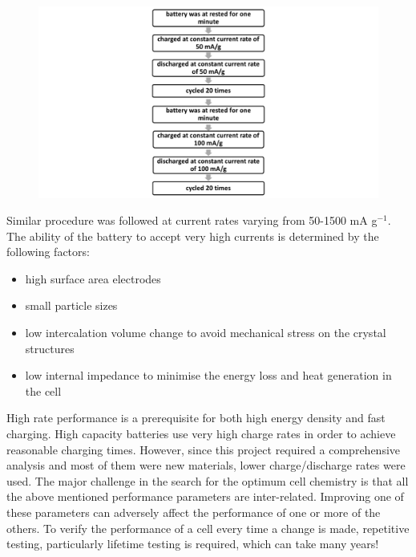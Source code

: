\begin{figure}[tbh!]
\centering
\includegraphics[width=\textwidth]{Figures/chap3fig/flow.pdf}
\caption{}
\label{Figures/chap3fig:flow}
\end{figure}

Similar procedure was followed at current rates varying from 50-1500 mA g$^{-1}$.\\
The ability of the battery to accept very high currents is determined by the following factors:
\begin{itemize}
    \item high surface area electrodes
    \item small particle sizes
    \item low intercalation volume change to avoid mechanical stress on the crystal structures
    \item low internal impedance to minimise the energy loss and heat generation in the cell
\end{itemize}

High rate performance is a prerequisite for both high energy density and fast charging. High capacity batteries use very high charge rates in order to achieve reasonable charging times. However, since this project required a comprehensive analysis and most of them were new materials, lower charge/discharge rates were used. 
The major challenge in the search for the optimum cell chemistry is that all the above mentioned performance parameters are inter-related. Improving one of these parameters can adversely affect the performance of one or more of the others. To verify the performance of a cell every time a change is made, repetitive testing, particularly lifetime testing is required, which can take many years! 





















